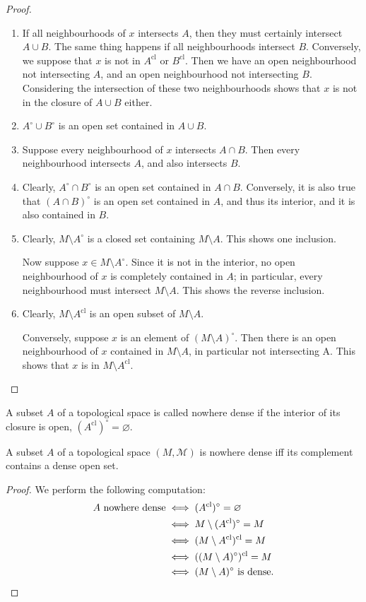 \documentclass[prb,12pt]{revtex4-2}
\theoremstyle{definition}
\theoremstyle{definition}
\theoremstyle{definition}
\newenvironment{parts}{\begin{enumerate}[label=(\alph*)]}{\end{enumerate}}
\begin{document}
\begin{proof}
	\begin{parts}
		\item If all neighbourhoods of $x$ intersects $A$, then they must certainly intersect $A\cup B$. The same thing happens if all neighbourhoods intersect $B$. Conversely, we suppose that $x$ is not in $A^\text{cl}$ or $B^\text{cl}$. Then we have an open neighbourhood not intersecting $A$, and an open neighbourhood not intersecting $B$. Considering the intersection of these two neighbourhoods shows that $x$ is not in the closure of $A\cup B$ either.
		\item $A^\circ\cup B^\circ$ is an open set contained in $A\cup B$.
		\item Suppose every neighbourhood of $x$ intersects $A\cap B$. Then every neighbourhood intersects $A$, and also intersects $B$.
		\item Clearly, $A^\circ \cap B^\circ$ is an open set contained in $A\cap B$. Conversely, it is also true that $(A\cap B)^\circ$ is an open set contained in $A$, and thus its interior, and it is also contained in $B$.
		\item Clearly, $M \setminus A^\circ$ is a closed set containing $M\setminus A$. This shows one inclusion.
		
		Now suppose $x\in M \setminus A^\circ$. Since it is not in the interior, no open neighbourhood of $x$ is completely contained in $A$; in particular, every neighbourhood must intersect $M\setminus A$. This shows the reverse inclusion.
		\item Clearly, $M\setminus A^\text{cl}$ is an open subset of $M \setminus A$.
		
		Conversely, suppose $x$ is an element of $(M \setminus A)^\circ$. Then there is an open neighbourhood of $x$ contained in $M \setminus A$, in particular not intersecting A. This shows that $x$ is in $M \setminus A^\text{cl}$.\qedhere
	\end{parts}
\end{proof}
	\begin{Definition}
		A subset $A$ of a topological space is called nowhere dense if the interior of its closure is open, $(A^\text{cl})^\circ=\varnothing$. 
	\end{Definition}
\begin{Theorem}
	A subset $A$ of a topological space $(M, \mathcal{M})$ is nowhere dense iff its complement contains a dense open set.
\end{Theorem}
\begin{proof}
		We perform the following computation:
		\begin{align*}
			A\text{ nowhere dense}&\iff (A^\text{cl})^\circ = \varnothing\\
			&\iff M \setminus (A^\text{cl})^\circ = M\\
			&\iff (M \setminus A^\text{cl})^\text{cl}=M\\
			&\iff ((M \setminus A)^\circ)^\text{cl}=M\\
			&\iff (M \setminus A)^\circ\text{ is dense}.\qedhere
		\end{align*}
\end{proof}
\end{document}
